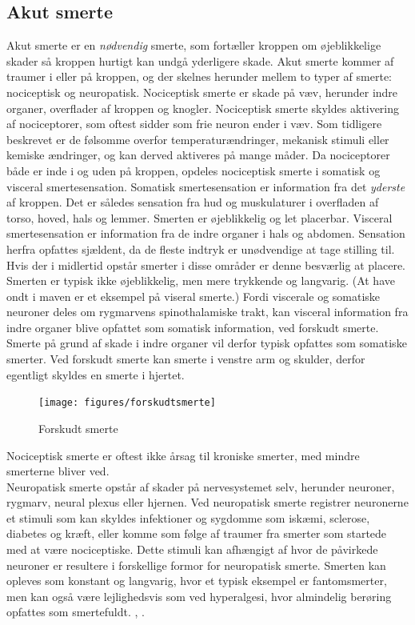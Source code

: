 \subsection{Akut smerte}
Akut smerte er en \textit{nødvendig} smerte, som fortæller kroppen om øjeblikkelige skader så kroppen hurtigt kan undgå yderligere skade. Akut smerte kommer af traumer i eller på kroppen, og der skelnes herunder mellem to typer af smerte: nociceptisk og neuropatisk. Nociceptisk smerte er skade på væv, herunder indre organer, overflader af kroppen og knogler. Nociceptisk smerte skyldes aktivering af nociceptorer, som oftest sidder som frie neuron ender i væv. Som tidligere beskrevet er de følsomme overfor temperaturændringer, mekanisk stimuli eller kemiske ændringer, og kan derved aktiveres på mange måder. Da nociceptorer både er inde i og uden på kroppen, opdeles nociceptisk smerte i somatisk og visceral smertesensation. Somatisk smertesensation er information fra det \textit{yderste} af kroppen. Det er således sensation fra hud og muskulaturer i overfladen af torso, hoved, hals og lemmer. \citep{Martini} Smerten er øjeblikkelig og let placerbar. 
Visceral smertesensation er information fra de indre organer i hals og abdomen. Sensation herfra opfattes sjældent, da de fleste indtryk er unødvendige at tage stilling til. Hvis der i midlertid opstår smerter i disse områder er denne besværlig at placere. Smerten er typisk ikke øjeblikkelig, men mere trykkende og langvarig. (At have ondt i maven er et eksempel på viseral smerte.)
Fordi viscerale og somatiske neuroner deles om rygmarvens spinothalamiske trakt, kan visceral information fra indre organer blive opfattet som somatisk information, ved forskudt smerte. Smerte på grund af skade i indre organer vil derfor typisk opfattes som somatiske smerter. Ved forskudt smerte kan smerte i venstre arm og skulder, derfor egentligt skyldes en smerte i hjertet.

\begin{figure}[H]
	\caption{Forskudt smerte}
	\label{forskudtsmerte}
	\centering
	\texttt{[image: figures/forskudtsmerte]}
	\flushleft
	\textit{\citep{Martini}}
\end{figure}


Nociceptisk smerte er oftest ikke årsag til kroniske smerter, med mindre smerterne bliver ved.\\ 
Neuropatisk smerte opstår af skader på nervesystemet selv, herunder neuroner, rygmarv, neural plexus eller hjernen. 
Ved neuropatisk smerte registrer neuronerne et stimuli som kan skyldes infektioner og sygdomme som iskæmi, sclerose, diabetes og kræft, eller komme som følge af traumer fra smerter som startede med at være nociceptiske. Dette stimuli kan afhængigt af hvor de påvirkede neuroner er resultere i forskellige formor for neuropatisk smerte. Smerten kan opleves som konstant og langvarig, hvor et typisk eksempel er fantomsmerter, men kan også være lejlighedsvis som ved hyperalgesi, hvor almindelig berøring opfattes som smertefuldt. \citep{Giangregorio1997}, \citep{Carmon}.\\



